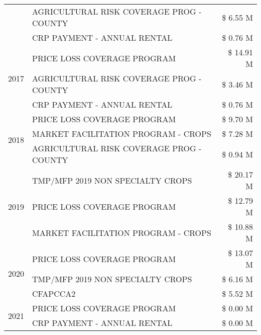 \begin{tabular}{llr}
 & AGRICULTURAL RISK COVERAGE PROG - COUNTY      & \$ 6.55 M \\
 & CRP PAYMENT - ANNUAL RENTAL                   & \$ 0.76 M \\
\cline{1-3}
\multirow[t]{3}{*}{2017} & PRICE LOSS COVERAGE PROGRAM & \$ 14.91 M \\
 & AGRICULTURAL RISK COVERAGE PROG - COUNTY & \$ 3.46 M \\
 & CRP PAYMENT - ANNUAL RENTAL & \$ 0.76 M \\
\cline{1-3}
\multirow[t]{3}{*}{2018} & PRICE LOSS COVERAGE PROGRAM & \$ 9.70 M \\
 & MARKET FACILITATION PROGRAM - CROPS & \$ 7.28 M \\
 & AGRICULTURAL RISK COVERAGE PROG - COUNTY & \$ 0.94 M \\
\cline{1-3}
\multirow[t]{3}{*}{2019} & TMP/MFP 2019 NON SPECIALTY CROPS & \$ 20.17 M \\
 & PRICE LOSS COVERAGE PROGRAM & \$ 12.79 M \\
 & MARKET FACILITATION PROGRAM - CROPS & \$ 10.88 M \\
\cline{1-3}
\multirow[t]{3}{*}{2020} & PRICE LOSS COVERAGE PROGRAM & \$ 13.07 M \\
 & TMP/MFP 2019 NON SPECIALTY CROPS & \$ 6.16 M \\
 & CFAPCCA2 & \$ 5.52 M \\
\cline{1-3}
\multirow[t]{2}{*}{2021} & PRICE LOSS COVERAGE PROGRAM & \$ 0.00 M \\
 & CRP PAYMENT - ANNUAL RENTAL & \$ 0.00 M \\
\cline{1-3}
\bottomrule
\end{tabular}
